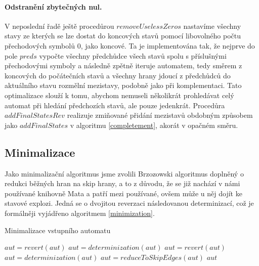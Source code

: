 \paragraph{Odstranění zbytečných nul.} V neposlední řadě ještě procedůrou $removeUselessZeros$ nastavíme všechny stavy ze kterých se lze dostat do koncových stavů pomocí libovolného počtu přechodových symbolů $0$, jako koncové. Ta je implementována tak, že nejprve do pole $preds$ vypočte všechny předchůdce všech stavů spolu s příslušnými přechodovými symboly a následně zpětně iteruje automatem, tedy směrem z koncových do počátečních stavů a všechny hrany jdoucí z předchůdců do aktuálního stavu rozmělní mezistavy, podobně jako při komplementaci. Tato optimalizace slouží k tomu, abychom nemuseli několikrát prohledávat celý automat při hledání předchozích stavů, ale pouze jedenkrát. Procedůra $addFinalStatesRev$ realizuje zmiňované přidání mezistavů obdobným způsobem jako $addFinalStates$ v algoritmu \ref{completement}, akorát v opačném směru.

\subsection{Minimalizace}

Jako minimalizační algoritmus jsme zvolili Brzozowski algoritmus doplněný o redukci běžných hran na skip hrany, a to z důvodu, že se již nachází v námi používané knihovně Mata a patří mezi používané, ovšem může u něj dojít ke stavové explozi. Jedná se o dvojitou reverzaci následovanou determinizací, což je formálněji vyjádřeno algoritmem \ref{minimization}.

\begin{algorithm}[h]
    \caption{Minimalizace vstupního automatu}
    \label{minimization}
        \begin{algorithmic}[1]
                \State $aut = revert(aut)$
                \State $aut = determinization(aut)$
                \State $aut = revert(aut)$
                \State $aut = determinization(aut)$
                \State $aut = reduceToSkipEdges(aut)$
                \State \Return $aut$
            \EndProcedure
        \end{algorithmic}
\end{algorithm}

